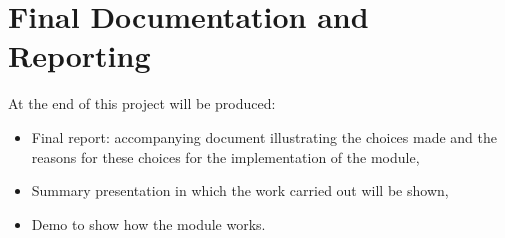 \section{Final Documentation and Reporting}
At the end of this project will be produced:
\begin{itemize}
	\item Final report: accompanying document illustrating the choices made and the reasons for these choices for the implementation of the module,
	\item Summary presentation in which the work carried out will be shown,
	\item Demo to show how the module works.
\end{itemize}
